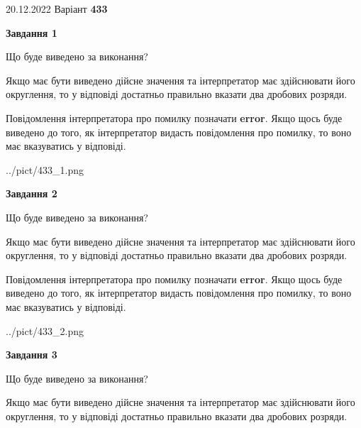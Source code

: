 \documentclass[12pt, ukrainian]{article}
\begin{document}
{20.12.2022 Варіант \No \textbf { 433 }\par}
{
\begin {Large}

{\begin {center}\textbf{Завдання 1}\end {center}}\par
Що буде виведено за виконання? \par

Якщо має бути виведено дійсне значення та інтерпретатор має здійснювати його округлення, 
то у відповіді достатньо правильно вказати два дробових розряди.

Повідомлення інтерпретатора про помилку позначати \textbf{error}.
Якщо щось буде виведено до того, як інтерпретатор видасть повідомлення про помилку, 
то воно має вказуватись у відповіді. \par

\begin{center}
	{../pict/433_1.png}
\end{center}
\newpage

{\begin {center}\textbf{Завдання 2}\end {center}}\par
Що буде виведено за виконання? \par

Якщо має бути виведено дійсне значення та інтерпретатор має здійснювати його округлення, 
то у відповіді достатньо правильно вказати два дробових розряди.

Повідомлення інтерпретатора про помилку позначати \textbf{error}.
Якщо щось буде виведено до того, як інтерпретатор видасть повідомлення про помилку, 
то воно має вказуватись у відповіді. \par

\begin{center}
	{../pict/433_2.png}
\end{center}
\newpage

{\begin {center}\textbf{Завдання 3}\end {center}}\par
Що буде виведено за виконання? \par

Якщо має бути виведено дійсне значення та інтерпретатор має здійснювати його округлення, 
то у відповіді достатньо правильно вказати два дробових розряди.


\end{Large}}
\end{document}

